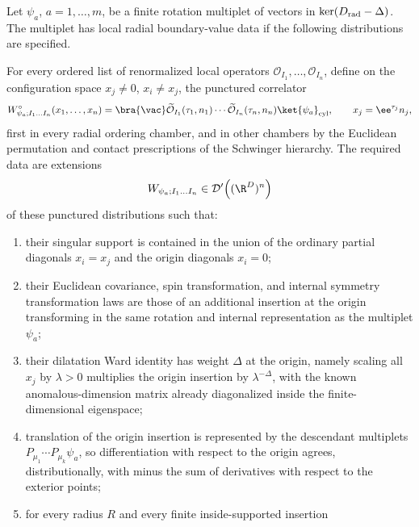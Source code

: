 \begin{definition}
\label{def:local-radial-boundary-value-state}
Let \(\psi_a\), \(a=1,\ldots,m\), be a finite rotation multiplet of vectors in
\(\ker(D_{\rm rad}-\Delta)\).  The multiplet has local radial boundary-value
data if the following distributions are specified.

For every ordered list of renormalized local operators
\(\mathcal O_{I_1},\ldots,\mathcal O_{I_n}\), define on the configuration
space \(x_j\neq0\), \(x_i\neq x_j\), the punctured correlator
\begin{equation}
  W_{\psi_a;I_1\ldots I_n}^{\circ}(x_1,\ldots,x_n)
  =
  \bra{\vac}
    \widetilde{\mathcal O}_{I_1}(\tau_1,n_1)\cdots
    \widetilde{\mathcal O}_{I_n}(\tau_n,n_n)
  \ket{\psi_a}_{\rm cyl},
  \qquad
  x_j=\ee^{\tau_j}n_j ,
  \label{eq:state-punctured-radial-correlator}
\end{equation}
first in every radial ordering chamber, and in other chambers by the
Euclidean permutation and contact prescriptions of the Schwinger hierarchy.
The required data are extensions
\begin{equation}
  W_{\psi_a;I_1\ldots I_n}
  \in
  \mathcal D'\!\left((\R^D)^n\right)
  \label{eq:state-local-boundary-distribution}
\end{equation}
of these punctured distributions such that:
\begin{enumerate}
  \item their singular support is contained in the union of the ordinary
  partial diagonals \(x_i=x_j\) and the origin diagonals \(x_i=0\);
  \item their Euclidean covariance, spin transformation, and internal
  symmetry transformation laws are those of an additional insertion at the
  origin transforming in the same rotation and internal representation as the
  multiplet \(\psi_a\);
  \item their dilatation Ward identity has weight \(\Delta\) at the origin,
  namely scaling all \(x_j\) by \(\lambda>0\) multiplies the origin insertion
  by \(\lambda^{-\Delta}\), with the known anomalous-dimension matrix already
  diagonalized inside the finite-dimensional eigenspace;
  \item translation of the origin insertion is represented by the descendant
  multiplets \(P_{\mu_1}\cdots P_{\mu_k}\psi_a\), so differentiation with
  respect to the origin agrees, distributionally, with minus the sum of
  derivatives with respect to the exterior points;
  \item for every radius \(R\) and every finite inside-supported insertion

\end{enumerate}
\end{definition}
